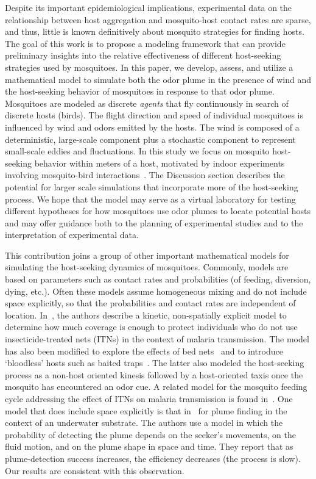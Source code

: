 \documentclass[10pt]{article}
\begin{document}
Despite its important epidemiological implications, experimental data on the relationship between host aggregation and mosquito-host contact rates are sparse, and thus, little is known definitively about mosquito strategies for finding hosts.
The goal of this work is to propose a modeling framework that can 
provide preliminary insights into the relative effectiveness of different host-seeking strategies used by mosquitoes.  
In this paper, we develop, assess, and utilize a mathematical model
to simulate  both the odor plume in the presence of wind and the host-seeking behavior of mosquitoes in response to that odor plume. Mosquitoes are modeled as discrete \textit{agents} that fly continuously in search of  discrete hosts (birds).
The flight direction and speed of individual mosquitoes is influenced by wind and odors
emitted by the hosts.
The wind is composed of a deterministic, large-scale component plus
a stochastic component to represent small-scale eddies and fluctuations.
In this study we focus on mosquito host-seeking behavior within meters of a host, motivated by indoor experiments involving mosquito-bird interactions~\cite{Foppa2011}.  
The Discussion section describes the potential for larger scale simulations that incorporate more of the host-seeking process.
We hope that the model may serve as a virtual laboratory for testing different hypotheses for how mosquitoes use odor plumes to locate potential hosts and may offer guidance both to the planning of experimental
studies and to the interpretation of experimental data.

This contribution joins a group of other important mathematical models for simulating the host-seeking dynamics of mosquitoes.  Commonly, models are based on parameters such as contact rates and probabilities (of feeding, diversion, dying, etc.).  Often these models assume homogeneous mixing and do not include space explicitly, so that the probabilities and contact rates are independent of location. 
%
In~\cite{KilleenEtAl2007}, the authors describe a kinetic, non-spatially explicit model to determine how much coverage is enough to protect individuals who do not use insecticide-treated nets (ITNs) in the context of malaria transmission.  The model has also been modified to explore the effects of bed nets~\cite{Killeen2007} and to introduce `bloodless' hosts such as baited traps~\cite{OkumuModel2010}.  The latter also modeled the host-seeking process as a non-host oriented kinesis followed by a host-oriented taxis once the mosquito has encountered an odor cue.  A related model for the mosquito feeding cycle addressing the effect of ITNs on malaria transmission is found in~\cite{LeMenach}.   One model that does include space explicitly is that in~\cite{Pasternak2009} for plume finding in the context of an underwater substrate.  The authors use a model in which the probability of detecting the plume depends on the seeker's movements, on the fluid motion, and on the plume shape in space and time. They report that as plume-detection success increases, the efficiency decreases (the process is slow).  Our results are consistent with this observation.
\end{document}
